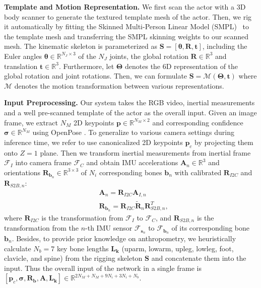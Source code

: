 \documentclass[letterpaper]{article} \usepackage{aaai23}  \usepackage{times}  \usepackage{helvet}  \usepackage{courier}  \usepackage[hyphens]{url}  \usepackage{graphicx} \urlstyle{rm} \def\UrlFont{\rm}  \usepackage{natbib}  \usepackage{caption} \frenchspacing  \setlength{\pdfpagewidth}{8.5in}  \setlength{\pdfpageheight}{11in}  \usepackage{algorithm}
\newcommand{\myparagraph}[1]{\vspace{0.1em}\noindent\textbf{#1}}
\begin{document}
\myparagraph{Template and Motion Representation.}
We first scan the actor with a 3D body scanner to generate the textured template mesh of the actor. Then, we rig it automatically by fitting the Skinned Multi-Person Linear Model (SMPL)~\cite{SMPL2015} to the template mesh and transferring the SMPL skinning weights to our scanned mesh.
The kinematic skeleton is parameterized as $\textbf{S}=[\mathbf{\theta}, \textbf{R},\textbf{t}]$, including the Euler angles $\mathbf{\theta} \in \mathbb{R}^{N_J\times3}$ of the $N_J$ joints, the global rotation $\textbf{R}\in\mathbb{R}^3$ and translation $\textbf{t} \in \mathbb{R}^{3}$. 
Furthermore, let $\mathbf{\Theta}$ denotes the 6D representation \cite{zhou2019continuity} of the global rotation and joint rotations.
Then, we can formulate $\textbf{S}=\mathcal{M}(\mathbf{\Theta},\textbf{t})$ where $\mathcal{M}$ denotes the motion transformation between various representations.

\myparagraph{Input Preprocessing.}
Our system takes the RGB video, inertial measurements and a well pre-scanned template of the actor as the overall input.
Given an image frame, we extract $N_M$ 2D keypoints $\boldsymbol{p} \in \mathbb{R}^{N_M\times2}$ and corresponding confidence $\boldsymbol{\sigma} \in \mathbb{R}^{N_M}$ using OpenPose \cite{OpenPose}. To generalize to various camera settings during inference time, we refer \cite{PhysAwareTOG2021} to use canonicalized 2D keypoints $\boldsymbol{p}_c$ by projecting them onto $Z=1$ plane. Then we transform inertial measurements from inertial frame $\mathcal{F}_I$ into camera frame $\mathcal{F}_C$ and obtain IMU accelerations $\mathbf{A}_{n}\in \mathbb{R}^{3}$ and orientations $\mathbf{R}_{\textbf{b}_n}\in \mathbb{R}^{3\times3}$ of $N_i$ corresponding bones $\textbf{b}_n$ with calibrated $\mathbf{R}_{I2C}$ and $\mathbf{R}_{S2B,n}$:
\begin{align}
    &\mathbf{A}_{n} = \mathbf{R}_{I2C} \mathbf{A}_{I,n}\\
    &\mathbf{R}_{\textbf{b}_n} = \mathbf{R}_{I2C} \mathbf{\widetilde{R}}_n \mathbf{R}_{S2B, n}^T,
\end{align} 
where $\mathbf{R}_{I2C}$ is the transformation from $\mathcal{F}_I$ to $\mathcal{F}_C$, and $\mathbf{R}_{S2B,n}$ is the transformation from the $n$-th IMU sensor $\mathcal{F}_{\textbf{s}_n}$ to $\mathcal{F}_{\textbf{b}_n}$ of its corresponding bone $\textbf{b}_n$.
Besides, to provide prior knowledge on anthropometry, we heuristically calculate $N_b=7$ key bone lengths $\mathbf{L_k}$ (uparm, lowarm, upleg, lowleg, foot, clavicle, and spine) from the rigging skeleton $\mathbf{S}$ and concatenate them into the input. Thus the overall input of the network in a single frame is $[\boldsymbol{p}_c, \boldsymbol{\sigma}, \mathbf{R}_{\textbf{b}}, \mathbf{A},  \mathbf{L_k}]\in \mathbb{R}^{2N_M+N_M+9N_i+3N_i+N_b}$.
\end{document}
